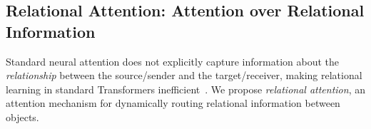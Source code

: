 \subsection{Relational Attention: Attention over Relational Information}

Standard neural attention does not explicitly capture information about the \textit{relationship} between the source/sender and the target/receiver, making relational learning in standard Transformers inefficient~\citep{lake2018generalization,barrett2018measuring,santoroSimpleNeuralNetwork2017,santoroRelationalRecurrentNeural2018,shanahanExplicitlyRelationalNeurala,webbEmergentSymbolsBinding2021,webbRelationalBottleneckInductive2024,kergNeuralArchitectureInductive2022,altabaa2024abstractors,altabaaLearningHierarchicalRelational2024}. We propose \textit{relational attention}, an attention mechanism for dynamically routing relational information between objects.

